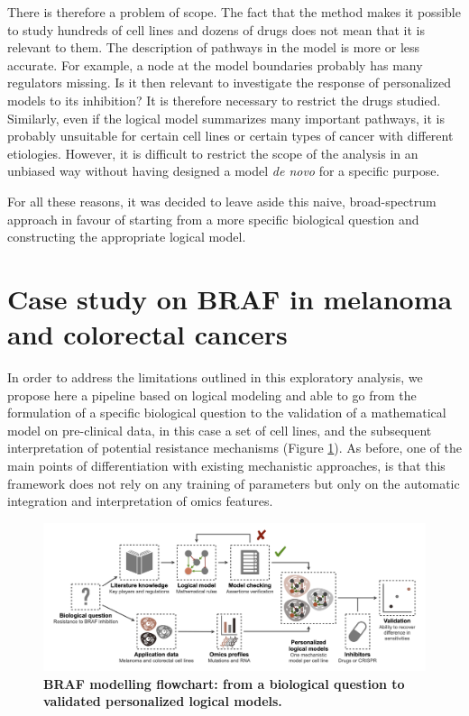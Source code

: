 \documentclass[a4paper,12pt,twoside,onecolumn,openright,final,oldfontcommands]{memoir}
\begin{document}
There is therefore a problem of scope. The fact that the method makes it
possible to study hundreds of cell lines and dozens of drugs does not
mean that it is relevant to them. The description of pathways in the
model is more or less accurate. For example, a node at the model
boundaries probably has many regulators missing. Is it then relevant to
investigate the response of personalized models to its inhibition? It is
therefore necessary to restrict the drugs studied. Similarly, even if
the logical model summarizes many important pathways, it is probably
unsuitable for certain cell lines or certain types of cancer with
different etiologies. However, it is difficult to restrict the scope of
the analysis in an unbiased way without having designed a model \emph{de
novo} for a specific purpose.

For all these reasons, it was decided to leave aside this naive,
broad-spectrum approach in favour of starting from a more specific
biological question and constructing the appropriate logical model.

\section{Case study on BRAF in melanoma and colorectal
cancers}\label{case-study-on-braf-in-melanoma-and-colorectal-cancers}

In order to address the limitations outlined in this exploratory
analysis, we propose here a pipeline based on logical modeling and able
to go from the formulation of a specific biological question to the
validation of a mathematical model on pre-clinical data, in this case a
set of cell lines, and the subsequent interpretation of potential
resistance mechanisms (Figure \ref{fig:BRAF-GA}). As before, one of the
main points of differentiation with existing mechanistic approaches, is
that this framework does not rely on any training of parameters but only
on the automatic integration and interpretation of omics features.

\begin{figure}

{\centering \includegraphics[width=0.9\linewidth]{fig/BRAF-GA} 

}

\caption[BRAF modelling flowchart: from a biological question to validated personalized logical models]{\textbf{BRAF modelling flowchart: from a
biological question to validated personalized logical models.}}\label{fig:BRAF-GA}
\end{figure}
\end{document}
